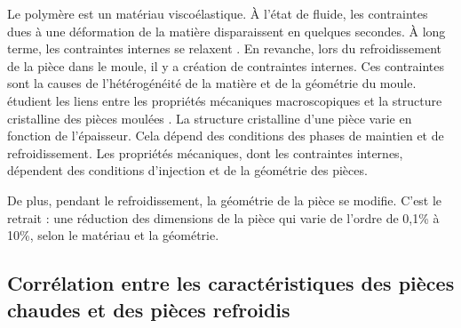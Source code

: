 Le polymère est un matériau viscoélastique.
À l'état de fluide, les contraintes dues à une déformation de la matière disparaissent en quelques secondes.
À long terme, les contraintes internes se relaxent \cite{giroud_mesure_2001}.
En revanche, lors du refroidissement de la pièce dans le moule, il y a création de contraintes internes.
Ces contraintes sont la causes de l'hétérogénéité de la matière et de la géométrie du moule.
\citeauthor{galeski_nano_2009} étudient les liens entre les propriétés mécaniques macroscopiques et la structure cristalline des pièces moulées \cite{galeski_nano_2009}.
La structure cristalline d'une pièce varie en fonction de l'épaisseur.
Cela dépend des conditions des phases de maintien et de refroidissement.
Les propriétés mécaniques, dont les contraintes internes, dépendent des conditions d'injection et de la géométrie des pièces.

De plus, pendant le refroidissement, la géométrie de la pièce se modifie. C'est le retrait : une réduction des dimensions de la pièce qui varie de l'ordre de 0,1\% à 10\%, selon le matériau et la géométrie.

\subsection{Corrélation entre les caractéristiques des pièces chaudes et des pièces refroidis}

